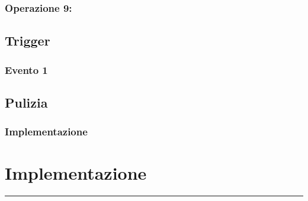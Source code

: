 \documentclass[legalpaper]{article}
\begin{document}
\subsubsection{Operazione 9:}

\subsection{Trigger}
\subsubsection{Evento 1}
\subsection{Pulizia}
\subsubsection{Implementazione}
\newpage

\section{Implementazione}
\rule{\linewidth}{1.5pt}
\end{document}
